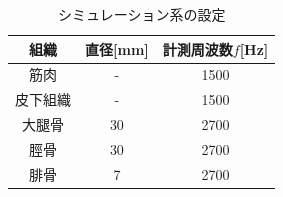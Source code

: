 \begin{table}[H]
\centering
\caption{シミュレーション系の設定}
\label{simulation_settei}
\begin{tabular}{|c|c|c|}
\hline
組織 & 直径[mm] & 計測周波数$f$[Hz]  \\ \hline
筋肉 & - &      1500 \\ \hline
皮下組織   & - &      1500\\ \hline
大腿骨  & 30 &     2700 \\ \hline
脛骨 & 30 &     2700 \\ \hline
腓骨  & 7 &     2700  \\ \hline
\end{tabular}
\end{table}
